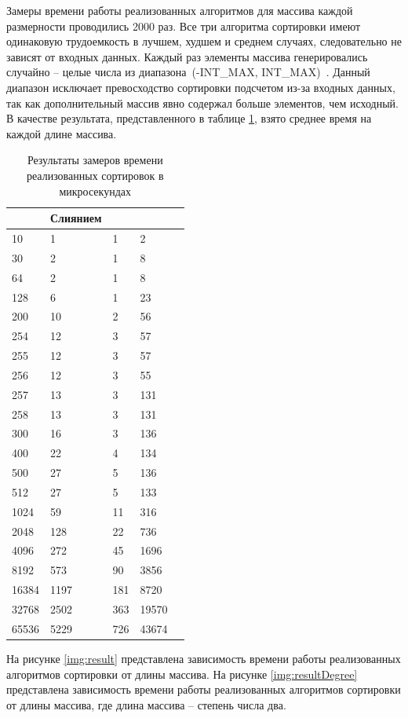 Замеры времени работы реализованных алгоритмов для массива каждой размерности проводились 2000 раз. Все три алгоритма сортировки имеют одинаковую трудоемкость в лучшем, худшем и среднем случаях, следовательно не зависят от входных данных. Каждый раз элементы массива генерировались случайно -- целые числа из диапазона~(-INT\_MAX, INT\_MAX)~\cite{si}. Данный диапазон исключает превосходство сортировки подсчетом из-за входных данных, так как дополнительный массив явно содержал больше элементов, чем исходный. В качестве результата, представленного в таблице \ref{tab:time}, взято среднее время на каждой длине массива.
\clearpage
\begin{table}
	\begin{center}
		\begin{flushleft}
		\caption{\label{tab:time}Результаты замеров времени реализованных сортировок в микросекундах}
		\end{flushleft}
	\begin{tabular}{|l|l|l|l|l|}
		\hline \specialcell{Длина массива} & \specialcell{Слиянием\\} &
		 \specialcell{Подсчетом} & \specialcell{Битонная} \\\hline
		10 & 1 & 1 & 2 \\ \hline
		30 & 2 & 1 & 8 \\ \hline
		64 & 2 & 1 & 8 \\ \hline
		128 & 6  & 1  & 23 \\ \hline
		200 & 10 &  2 &  56 \\ \hline
		254 & 12 & 3 & 57 \\ \hline
		255 & 12 &  3 &  57 \\ \hline
		256 & 12 &  3 &  55 \\ \hline
		257 & 13 &  3 &  131   \\ \hline
		258 & 13 & 3 & 131 \\ \hline
		300 & 16 &  3 &  136 \\ \hline
		400 & 22 &  4 &  134 \\ \hline
		500 & 27 &  5 &  136 \\ \hline
		512 & 27 &  5 &  133 \\ \hline
		1024 & 59  & 11  & 316 \\ \hline
		2048 & 128 &  22 &  736 \\ \hline
		4096 & 272 &  45 &  1696 \\ \hline
		8192 & 573 &  90 &  3856  \\ \hline
		16384 & 1197 & 181 & 8720 \\ \hline
		32768 & 2502 & 363 & 19570 \\ \hline
		65536 & 5229 & 726 & 43674 \\ \hline
	\end{tabular}
	\end{center}
\end{table}
На рисунке \ref{img:result} представлена зависимость времени работы реализованных алгоритмов сортировки от длины массива. На рисунке \ref{img:resultDegree} представлена зависимость времени работы реализованных алгоритмов сортировки от длины массива, где длина массива -- степень числа два.

